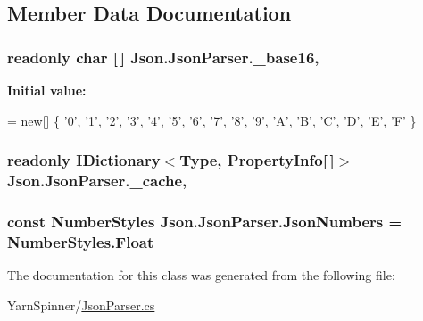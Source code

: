 \subsection{Member Data Documentation}
\hypertarget{a00046_a9d97f297996ac634f58dd842ebc00171}{
\subsubsection[{\-\_\-base16}]{\setlength{\rightskip}{0pt plus 5cm}readonly char \mbox{[}$\,$\mbox{]} Json.\-Json\-Parser.\-\_\-base16\hspace{0.3cm}{\ttfamily [static]}, {\ttfamily [private]}}}\label{a00046_a9d97f297996ac634f58dd842ebc00171}
{\bfseries Initial value\-:}
\begin{DoxyCode}
= \textcolor{keyword}{new}[]
                             \{
                                 \textcolor{charliteral}{'0'}, \textcolor{charliteral}{'1'}, \textcolor{charliteral}{'2'}, \textcolor{charliteral}{'3'}, 
                                 \textcolor{charliteral}{'4'}, \textcolor{charliteral}{'5'}, \textcolor{charliteral}{'6'}, \textcolor{charliteral}{'7'}, 
                                 \textcolor{charliteral}{'8'}, \textcolor{charliteral}{'9'}, \textcolor{charliteral}{'A'}, \textcolor{charliteral}{'B'}, 
                                 \textcolor{charliteral}{'C'}, \textcolor{charliteral}{'D'}, \textcolor{charliteral}{'E'}, \textcolor{charliteral}{'F'}
                             \}
\end{DoxyCode}
\hypertarget{a00046_ae6f928a5caa81742eb3bac3e986f92f6}{
\subsubsection[{\-\_\-cache}]{\setlength{\rightskip}{0pt plus 5cm}readonly I\-Dictionary$<$Type, Property\-Info\mbox{[}$\,$\mbox{]}$>$ Json.\-Json\-Parser.\-\_\-cache\hspace{0.3cm}{\ttfamily [static]}, {\ttfamily [private]}}}\label{a00046_ae6f928a5caa81742eb3bac3e986f92f6}
\hypertarget{a00046_ad05db33540abe9864b13b6b5c637a354}{
\subsubsection[{Json\-Numbers}]{\setlength{\rightskip}{0pt plus 5cm}const Number\-Styles Json.\-Json\-Parser.\-Json\-Numbers = Number\-Styles.\-Float\hspace{0.3cm}{\ttfamily [private]}}}\label{a00046_ad05db33540abe9864b13b6b5c637a354}


The documentation for this class was generated from the following file\-:\begin{DoxyCompactItemize}
\item 
Yarn\-Spinner/\hyperlink{a00118}{Json\-Parser.\-cs}\end{DoxyCompactItemize}

